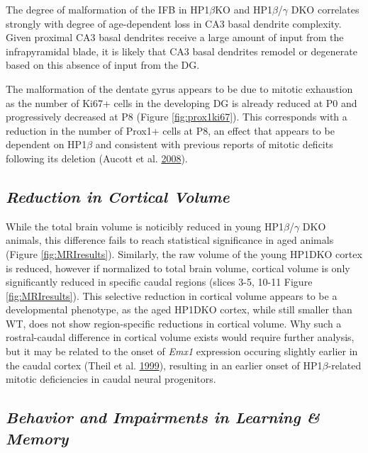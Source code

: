 \documentclass[onehalf,12pt]{beavtex}
\begin{document}
  The degree of malformation of the IFB in HP1\(\beta\)KO and
  HP1\(\beta\)/\(\gamma\) DKO correlates strongly with degree of
  age-dependent loss in CA3 basal dendrite complexity. Given proximal CA3
  basal dendrites receive a large amount of input from the infrapyramidal
  blade, it is likely that CA3 basal dendrites remodel or degenerate based
  on this absence of input from the DG.
  
  The malformation of the dentate gyrus appears to be due to mitotic
  exhaustion as the number of Ki67+ cells in the developing DG is already
  reduced at P0 and progressively decreased at P8 (Figure
  \ref{fig:prox1ki67}). This corresponds with a reduction in the number of
  Prox1+ cells at P8, an effect that appears to be dependent on
  HP1\(\beta\) and consistent with previous reports of mitotic deficits
  following its deletion (Aucott et al.
  \protect\hyperlink{ref-AucottHP1requireddevelopment2008}{2008}).
  
  \subsection*{\texorpdfstring{\emph{Reduction in Cortical
  Volume}}{Reduction in Cortical Volume}}\label{reduction-in-cortical-volume}
  
  While the total brain volume is noticibly reduced in young
  HP1\(\beta\)/\(\gamma\) DKO animals, this difference fails to reach
  statistical significance in aged animals (Figure \ref{fig:MRIresults}).
  Similarly, the raw volume of the young HP1DKO cortex is reduced, however
  if normalized to total brain volume, cortical volume is only
  significantly reduced in specific caudal regions (slices 3-5, 10-11
  Figure \ref{fig:MRIresults}). This selective reduction in cortical
  volume appears to be a developmental phenotype, as the aged HP1DKO
  cortex, while still smaller than WT, does not show region-specific
  reductions in cortical volume. Why such a rostral-caudal difference in
  cortical volume exists would require further analysis, but it may be
  related to the onset of \emph{Emx1} expression occuring slightly earlier
  in the caudal cortex (Theil et al.
  \protect\hyperlink{ref-TheilGli3requiredEmx1999}{1999}), resulting in an
  earlier onset of HP1\(\beta\)-related mitotic deficiencies in caudal
  neural progenitors.
  
  \subsection*{\texorpdfstring{\emph{Behavior and Impairments in Learning
  \&
  Memory}}{Behavior and Impairments in Learning \& Memory}}\label{behavior-and-impairments-in-learning-memory}
  
\end{document}
